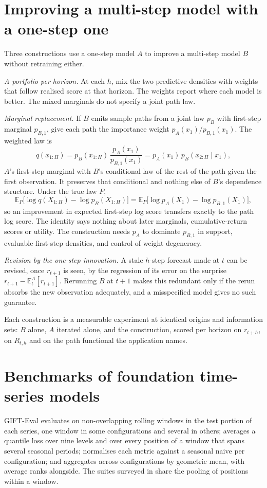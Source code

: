 \documentclass[11pt]{article}
\newcommand{\E}{\mathbb{E}}
\begin{document}
\section{Improving a multi-step model with a one-step one}

Three constructions use a one-step model $A$ to improve a multi-step model $B$ without retraining either.

\emph{A portfolio per horizon.} At each $h$, mix the two predictive densities with weights that follow realised score at that horizon. The weights report where each model is better. The mixed marginals do not specify a joint path law.

\emph{Marginal replacement.} If $B$ emits sample paths from a joint law $p_B$ with first-step marginal $p_{B,1}$, give each path the importance weight $p_A(x_1)/p_{B,1}(x_1)$. The weighted law is
\[
q(x_{1:H}) = p_B(x_{1:H})\,\frac{p_A(x_1)}{p_{B,1}(x_1)} = p_A(x_1)\, p_B(x_{2:H} \mid x_1),
\]
$A$'s first-step marginal with $B$'s conditional law of the rest of the path given the first observation. It preserves that conditional and nothing else of $B$'s dependence structure. Under the true law $P$,
\[
\E_P\big[\log q(X_{1:H}) - \log p_B(X_{1:H})\big] = \E_P\big[\log p_A(X_1) - \log p_{B,1}(X_1)\big],
\]
so an improvement in expected first-step log score transfers exactly to the path log score. The identity says nothing about later marginals, cumulative-return scores or utility. The construction needs $p_A$ to dominate $p_{B,1}$ in support, evaluable first-step densities, and control of weight degeneracy.

\emph{Revision by the one-step innovation.} A stale $h$-step forecast made at $t$ can be revised, once $r_{t+1}$ is seen, by the regression of its error on the surprise $r_{t+1} - \E^A_t[r_{t+1}]$. Rerunning $B$ at $t+1$ makes this redundant only if the rerun absorbs the new observation adequately, and a misspecified model gives no such guarantee.

Each construction is a measurable experiment at identical origins and information sets: $B$ alone, $A$ iterated alone, and the construction, scored per horizon on $r_{t+h}$, on $R_{t,h}$ and on the path functional the application names.

\section{Benchmarks of foundation time-series models}

GIFT-Eval \citep{aksu2024gifteval} evaluates on non-overlapping rolling windows in the test portion of each series, one window in some configurations and several in others; averages a quantile loss over nine levels and over every position of a window that spans several seasonal periods; normalises each metric against a seasonal naive per configuration; and aggregates across configurations by geometric mean, with average ranks alongside. The suites surveyed in \citet{cotton2026stronger} share the pooling of positions within a window.
\end{document}
